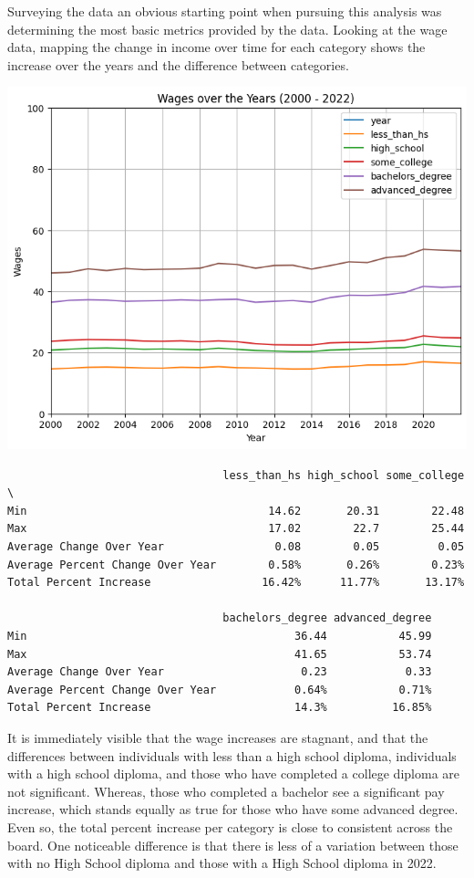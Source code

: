 \documentclass[
  letterpaper,
  DIV=11,
  numbers=noendperiod]{scrartcl}
\begin{document}
Surveying the data an obvious starting point when pursuing this analysis
was determining the most basic metrics provided by the data. Looking at
the wage data, mapping the change in income over time for each category
shows the increase over the years and the difference between categories.

\includegraphics{Markdown_files/figure-pdf/cell-3-output-1.png}

\begin{verbatim}
                                 less_than_hs high_school some_college  \
Min                                     14.62       20.31        22.48   
Max                                     17.02        22.7        25.44   
Average Change Over Year                 0.08        0.05         0.05   
Average Percent Change Over Year        0.58%       0.26%        0.23%   
Total Percent Increase                 16.42%      11.77%       13.17%   

                                 bachelors_degree advanced_degree  
Min                                         36.44           45.99  
Max                                         41.65           53.74  
Average Change Over Year                     0.23            0.33  
Average Percent Change Over Year            0.64%           0.71%  
Total Percent Increase                      14.3%          16.85%  
\end{verbatim}

It is immediately visible that the wage increases are stagnant, and that
the differences between individuals with less than a high school
diploma, individuals with a high school diploma, and those who have
completed a college diploma are not significant. Whereas, those who
completed a bachelor see a significant pay increase, which stands
equally as true for those who have some advanced degree. Even so, the
total percent increase per category is close to consistent across the
board. One noticeable difference is that there is less of a variation
between those with no High School diploma and those with a High School
diploma in 2022.
\end{document}
